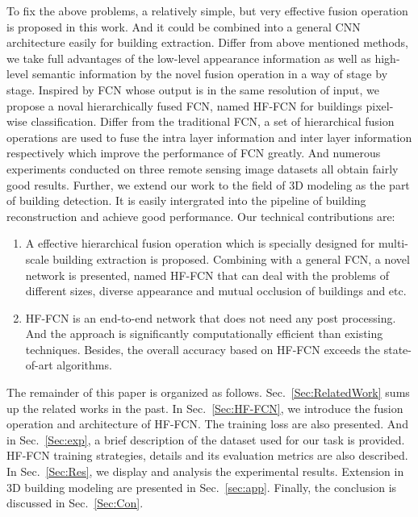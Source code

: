 To fix the above problems, a relatively simple, but very effective fusion operation is proposed in this work. And it could be combined into a general CNN architecture easily for building extraction. 
Differ from above mentioned methods, we take full advantages of the low-level appearance information as well as high-level semantic information by the novel fusion operation in a way of stage by stage.
Inspired by FCN\cite{IEEEexample:Long_2015_CVPR} whose output is in the same resolution of input, we propose a noval hierarchically fused FCN, named HF-FCN for buildings pixel-wise classification.
Differ from the traditional FCN, a set of hierarchical fusion operations are used to fuse the intra layer information and inter layer information respectively which improve the performance of FCN greatly.
And numerous experiments conducted on three remote sensing image datasets all obtain fairly good results.
Further, we extend our work to the field of 3D modeling as the part of building detection. It is easily intergrated into the pipeline of building reconstruction and achieve good performance.
Our technical contributions are:
%
\begin{enumerate}
	\item A effective hierarchical fusion operation which is specially designed for multi-scale building extraction is proposed. Combining with a general FCN, a novel network is presented, named HF-FCN that can deal with the problems of different sizes, diverse appearance and mutual occlusion of buildings and etc.
	\item HF-FCN is an end-to-end network that does not need any post processing. And the approach is significantly computationally efficient than existing techniques. Besides, the overall accuracy based on HF-FCN exceeds the state-of-art algorithms.
\end{enumerate}

The remainder of this paper is organized as follows. Sec.~\ref{Sec:RelatedWork} sums up the related works in the past.
In Sec.~\ref{Sec:HF-FCN}, we introduce the fusion operation and architecture of HF-FCN. The training loss are also presented.
And in Sec.~\ref{Sec:exp}, a brief description of the dataset used for our task is provided. HF-FCN training strategies, details and its evaluation metrics are also described.
In Sec.~\ref{Sec:Res}, we display and analysis the experimental results.
Extension in 3D building modeling are presented in Sec.~\ref{sec:app}.
Finally, the conclusion is discussed in Sec.~\ref{Sec:Con}.
